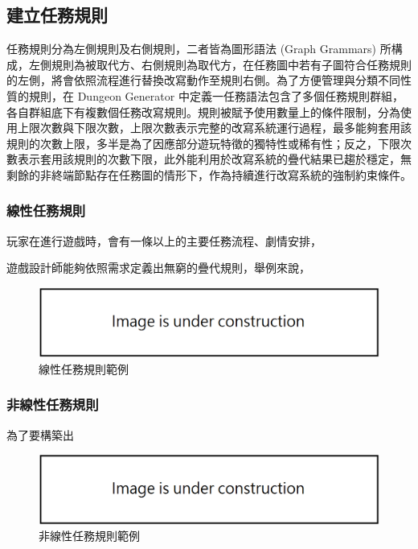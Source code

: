 \subsection{建立任務規則}
\label{ssec:method-missiongrammars-rules}

任務規則分為左側規則及右側規則，二者皆為圖形語法 (Graph Grammars) 所構成，左側規則為被取代方、右側規則為取代方，在任務圖中若有子圖符合任務規則的左側，將會依照流程進行替換改寫動作至規則右側。為了方便管理與分類不同性質的規則，在 Dungeon Generator 中定義一任務語法包含了多個任務規則群組，各自群組底下有複數個任務改寫規則。規則被賦予使用數量上的條件限制，分為使用上限次數與下限次數，上限次數表示完整的改寫系統運行過程，最多能夠套用該規則的次數上限，多半是為了因應部分遊玩特徵的獨特性或稀有性；反之，下限次數表示套用該規則的次數下限，此外能利用於改寫系統的疊代結果已趨於穩定，無剩餘的非終端節點存在任務圖的情形下，作為持續進行改寫系統的強制約束條件。

\subsubsection{線性任務規則}
\label{sssec:method-missiongrammars-rules-linearrules}

玩家在進行遊戲時，會有一條以上的主要任務流程、劇情安排，

遊戲設計師能夠依照需求定義出無窮的疊代規則，舉例來說，


\begin{figure}[h]
  \begin{center}
    \includegraphics[width=1.0\textwidth]{figures/under_construction.png}
    \caption{線性任務規則範例} 
    \label{fig:missiongrammars-rules-linear-example}
  \end{center}
\end{figure}

\subsubsection{非線性任務規則}
\label{sssec:method-missiongrammars-rules-nonlinearrules}

為了要構築出


\begin{figure}[h]
  \begin{center}
    \includegraphics[width=1.0\textwidth]{figures/under_construction.png}
    \caption{非線性任務規則範例} 
    \label{fig:missiongrammars-rules-nonlinear-example}
  \end{center}
\end{figure}

